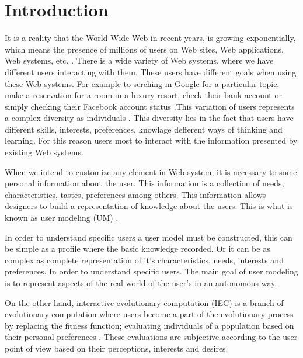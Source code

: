 \chapter{Introduction} \label{introduction}


\par It is a reality that the World Wide Web in recent years, is growing
exponentially, which means the presence of millions of users on Web sites, Web
applications, Web systems, etc. \cite{albert1999internet}. There is a wide
variety of Web systems, where we have different users interacting with them.
These users have different goals when using these Web systems. For example to
serching  in Google \cite{google} for a particular topic, make a reservation for
a room in a luxury resort, check their bank account or simply checking their
Facebook account status \cite{cockburn2001web}.This variation of users
represents a complex diversity as individuals \cite{zhao2006internet}. This
diversity lies in the fact that users have different skills, interests,
preferences, knowlage defferent  ways of thinking and learning. For this reason
users most to interact with the information presented by existing Web systems.
\par When we intend to customize any element in Web system,  it is necessary to
some personal information about the user. This information is a collection of
needs, characteristics, tastes, preferences among others.  This information
allows designers to build a representation of knowledge about the users. This is
what is known as user modeling (UM) \cite{razmerita2009user} \cite{fischer2001user}.

\par  In order to understand specific users a user model must be constructed,
this can be simple as a profile where the basic knowledge recorded. Or it can be
as complex as complete representation of it's characteristics, needs, interests
and preferences. In order to understand specific users. The main goal of user
modeling is to represent aspects of the real world of the user's in an
autonomous way.

\par On the other hand, interactive evolutionary computation (IEC)
is a branch of evolutionary computation where users become a part of the
evolutionary process by replacing the fitness function; evaluating individuals
of a population based on their personal preferences
\cite{takagi2001interactive}. These evaluations are subjective according to the
user point of view based on their perceptions, interests and desires.

